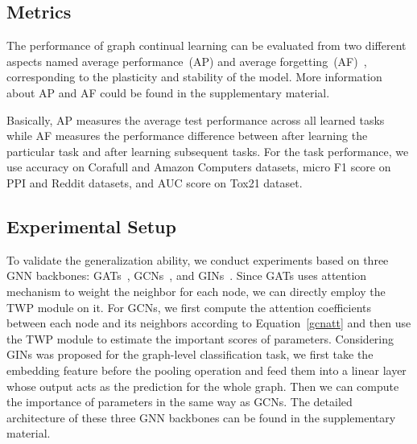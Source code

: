 \documentclass[letterpaper]{article} %
\begin{document}
\subsection{Metrics}
The performance of graph continual learning can be evaluated from
two different aspects named average performance~(AP) 
and average forgetting~(AF)~\cite{lopez2017gradient}, 
corresponding to the {plasticity and stability} of the model. 
More information about AP and AF could be found in the supplementary material.

Basically, AP measures the average test performance across all learned tasks 
while AF measures the performance difference between after 
learning the particular task and after learning subsequent tasks. 
For the task performance,
we use accuracy on Corafull and Amazon Computers datasets,
micro F1 score on PPI and Reddit datasets, and 
AUC score on Tox21 dataset.



\subsection{Experimental Setup}
To validate the generalization ability,
we conduct experiments based on three GNN backbones:
GATs~\cite{velivckovic2017graph}, 
GCNs~\cite{kipf2016semi}, and 
GINs~\cite{xu2018powerful}.
Since GATs uses attention mechanism to weight the neighbor for each node, 
we can directly employ the TWP module on it.
For GCNs, we first compute the attention coefficients between each node 
and its neighbors according to Equation~\ref{gcnatt} and
then use the TWP module to estimate the important scores of parameters.
Considering GINs was proposed for the graph-level classification task, we first take the embedding feature before the pooling operation and feed them into a linear layer whose output acts as the 
prediction for the whole graph.
Then we can compute the importance of parameters in the same way as GCNs.
The detailed architecture of these three GNN backbones
can be found in the supplementary material.
\end{document}
